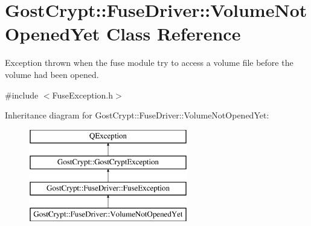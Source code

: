 \hypertarget{class_gost_crypt_1_1_fuse_driver_1_1_volume_not_opened_yet}{}\section{Gost\+Crypt\+:\+:Fuse\+Driver\+:\+:Volume\+Not\+Opened\+Yet Class Reference}
\label{class_gost_crypt_1_1_fuse_driver_1_1_volume_not_opened_yet}


Exception thrown when the fuse module try to access a volume file before the volume had been opened.  




{\ttfamily \#include $<$Fuse\+Exception.\+h$>$}

Inheritance diagram for Gost\+Crypt\+:\+:Fuse\+Driver\+:\+:Volume\+Not\+Opened\+Yet\+:\begin{figure}[H]
\begin{center}
\leavevmode
\includegraphics[height=4.000000cm]{class_gost_crypt_1_1_fuse_driver_1_1_volume_not_opened_yet}
\end{center}
\end{figure}
